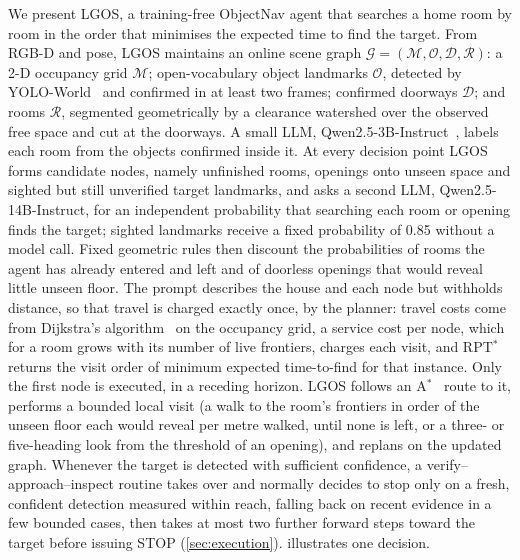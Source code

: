 \documentclass[10pt]{article}
\newcommand{\ours}{LGOS\xspace}
\newcommand{\G}{\mathcal{G}}
\newcommand{\M}{\mathcal{M}}
\newcommand{\Ob}{\mathcal{O}}
\newcommand{\D}{\mathcal{D}}
\newcommand{\R}{\mathcal{R}}
\begin{document}
We present \ours, a training-free ObjectNav agent that searches a home room by room in the order that minimises the
expected time to find the target. From RGB-D and pose, \ours maintains an online scene graph $\G=(\M,\Ob,\D,\R)$: a
2-D occupancy grid $\M$; open-vocabulary object landmarks $\Ob$, detected by YOLO-World~\citep{cheng2024yolo} and
confirmed in at least two frames; confirmed doorways $\D$; and rooms $\R$, segmented geometrically by a clearance
watershed over the observed free space and cut at the doorways. A small LLM, Qwen2.5-3B-Instruct~\citep{yang2024qwen25},
labels each room from the objects confirmed inside it. At every decision point \ours forms candidate nodes, namely
unfinished rooms, openings onto unseen space and sighted but still unverified target landmarks, and asks a second
LLM, Qwen2.5-14B-Instruct, for an independent probability that searching each room or opening finds the target;
sighted landmarks receive a fixed probability of 0.85 without a model call.
Fixed geometric rules then discount the probabilities of rooms the agent has already entered and left and of doorless
openings that would reveal little unseen floor.
The prompt describes the house and each node but withholds distance, so that travel is charged exactly once, by the
planner: travel costs come from Dijkstra's algorithm~\citep{dijkstra1959note} on the occupancy grid, a
service cost per node, which for a room grows with its number of live frontiers, charges each visit, and RPT$^*$ returns the visit order of minimum expected time-to-find for that instance. Only the first node is
executed, in a receding horizon. \ours follows an A$^*$~\citep{hart1968formal} route to it, performs a bounded local
visit (a walk to the room's frontiers in order of the unseen floor each would reveal per metre walked, until none
is left, or a three- or five-heading look from the threshold of an opening), and replans on the updated graph. Whenever the target is detected with sufficient confidence, a
verify--approach--inspect routine takes over and normally decides to stop only on a fresh, confident detection measured
within reach, falling back on recent evidence in a few bounded cases, then takes at most two further forward steps
toward the target before issuing STOP (\cref{sec:execution}). 
illustrates one decision.
\end{document}
